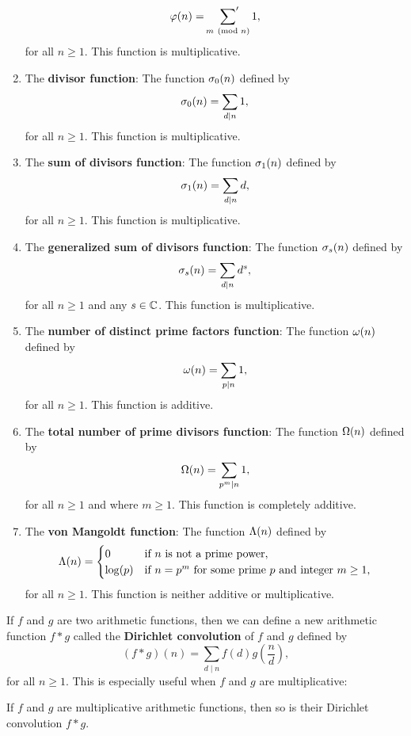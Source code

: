 \begin{enumerate}[label=(\roman*)]
      \[
        \varphi(n) = \sideset{}{'}\sum_{m \ \left(\text{mod }n\right)}1,
      \]
      for all $n \ge 1$. This function is multiplicative.
      \item The \textbf{divisor function}: The function $\sigma_{0}(n)$ defined by
      \[
        \sigma_{0}(n) = \sum_{d \mid n}1,
      \]
      for all $n \ge 1$. This function is multiplicative.
      \item The \textbf{sum of divisors function}: The function $\sigma_{1}(n)$ defined by
      \[
        \sigma_{1}(n) = \sum_{d \mid n}d,
      \]
      for all $n \ge 1$. This function is multiplicative.
      \item The \textbf{generalized sum of divisors function}: The function $\sigma_{s}(n)$ defined by
      \[
        \sigma_{s}(n) = \sum_{d \mid n}d^{s},
      \]
      for all $n \ge 1$ and any $s \in \mathbb{C}$. This function is multiplicative.
      \item The \textbf{number of distinct prime factors function}: The function $\omega(n)$ defined by
      \[
        \omega(n) = \sum_{p \mid n}1,
      \]
      for all $n \ge 1$. This function is additive.
      \item The \textbf{total number of prime divisors function}: The function $\Omega(n)$ defined by
      \[
        \Omega(n) = \sum_{p ^{m} \mid n}1,
      \]
      for all $n \ge 1$ and where $m \ge 1$. This function is completely additive.
      \item The \textbf{von Mangoldt function}: The function $\Lambda(n)$ defined by
      \[
        \Lambda(n) = \begin{cases} 0 & \text{if $n$ is not a prime power}, \\ \log(p) & \text{if $n = p^{m}$ for some prime $p$ and integer $m \ge 1$}, \end{cases}
      \]
      for all $n \ge 1$. This function is neither additive or multiplicative.
    \end{enumerate}
    If $f$ and $g$ are two arithmetic functions, then we can define a new arithmetic function $f \ast g$ called the \textbf{Dirichlet convolution} of $f$ and $g$ defined by
    \[
      (f \ast g)(n) = \sum_{d \mid n}f(d)g\left(\frac{n}{d}\right),
    \]
    for all $n \ge 1$. This is especially useful when $f$ and $g$ are multiplicative:

    \begin{proposition}
      If $f$ and $g$ are multiplicative arithmetic functions, then so is their Dirichlet convolution $f \ast g$.
    \end{proposition}
